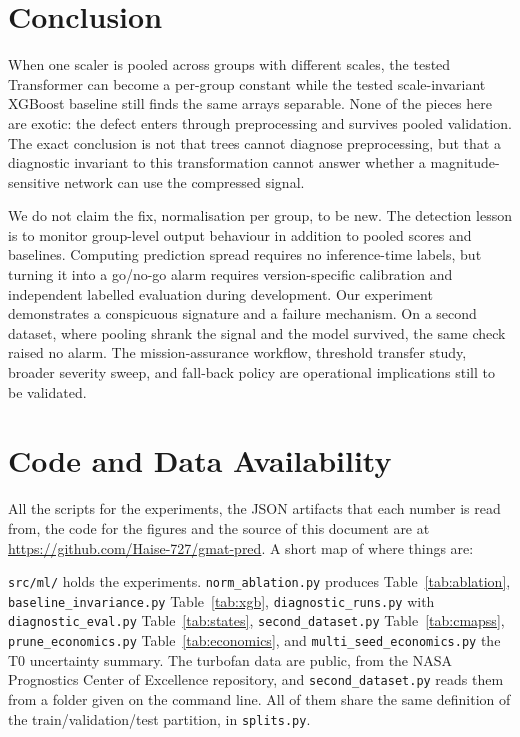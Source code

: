 \documentclass[preprint,12pt,authoryear]{elsarticle}
\begin{document}
\section{Conclusion}
\label{sec:conclusion}

When one scaler is pooled across groups with different scales, the tested Transformer can become a per-group constant while the tested scale-invariant XGBoost baseline still finds the same arrays separable. None of the pieces here are exotic: the defect enters through preprocessing and survives pooled validation. The exact conclusion is not that trees cannot diagnose preprocessing, but that a diagnostic invariant to this transformation cannot answer whether a magnitude-sensitive network can use the compressed signal.

We do not claim the fix, normalisation per group, to be new. The detection lesson is to monitor group-level output behaviour in addition to pooled scores and baselines. Computing prediction spread requires no inference-time labels, but turning it into a go/no-go alarm requires version-specific calibration and independent labelled evaluation during development. Our experiment demonstrates a conspicuous signature and a failure mechanism. On a second dataset, where pooling shrank the signal and the model survived, the same check raised no alarm. The mission-assurance workflow, threshold transfer study, broader severity sweep, and fall-back policy are operational implications still to be validated.

\section{Code and Data Availability}
\label{sec:code}

All the scripts for the experiments, the JSON artifacts that each number is read from, the code for the figures and the source of this document are at \url{https://github.com/Haise-727/gmat-pred}. A short map of where things are:

\begin{sloppypar}
\texttt{src/ml/} holds the experiments. \texttt{norm\_ablation.py} produces Table~\ref{tab:ablation}, \texttt{baseline\_invariance.py} Table~\ref{tab:xgb}, \texttt{diagnostic\_runs.py} with \texttt{diagnostic\_eval.py} Table~\ref{tab:states}, \texttt{second\_dataset.py} Table~\ref{tab:cmapss}, \texttt{prune\_economics.py} Table~\ref{tab:economics}, and \texttt{multi\_seed\_economics.py} the T0 uncertainty summary. The turbofan data are public, from the NASA Prognostics Center of Excellence repository, and \texttt{second\_dataset.py} reads them from a folder given on the command line. All of them share the same definition of the train/validation/test partition, in \texttt{splits.py}.
\end{sloppypar}
\end{document}
